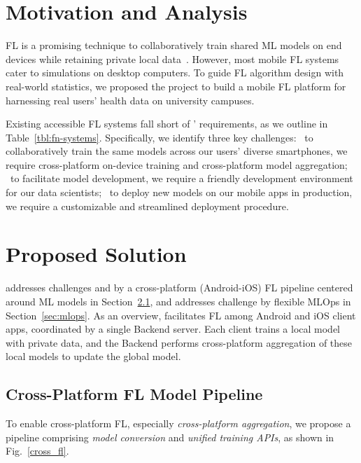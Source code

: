 \documentclass[conference]{IEEEtran}
\begin{document}
\section{Motivation and Analysis}

FL is a promising technique to collaboratively train shared ML models on
end devices while retaining private local data~\cite{wang2023federated}.
However, most mobile FL systems cater to simulations on desktop computers.
To guide FL algorithm design with real-world statistics,
we proposed the \FedCampus{} project to build a mobile FL platform for
harnessing real users' health data on university campuses.

Existing accessible FL systems fall short of \FedCampus{}' requirements,
as we outline in Table~\ref{tbl:fn-systems}.
Specifically, we identify three key challenges:
\challa~to collaboratively train the same models across
our users' diverse smartphones,
we require cross-platform on-device training and
cross-platform model aggregation;
\challb~to facilitate model development,
we require a friendly development environment for our data scientists;
\challc~to deploy new models on our mobile apps in production,
we require a customizable and streamlined deployment procedure.

\section{Proposed Solution}

\FedKit{} addresses challenges \challa{} and \challb{} by
a cross-platform (Android-iOS) FL pipeline centered around ML models in
Section~\ref{sec:pipeline},
and addresses challenge \challc{} by flexible MLOps in Section~\ref{sec:mlops}.
As an overview,
\FedKit{} facilitates FL among Android and iOS client apps,
coordinated by a single Backend server.
Each client trains a local model with private data,
and the Backend performs cross-platform aggregation of these local models to update the global model.

\subsection{Cross-Platform FL Model Pipeline}
\label{sec:pipeline}

To enable cross-platform FL,
especially \textit{cross-platform aggregation},
we propose a pipeline comprising
\textit{model conversion} and
\textit{unified training APIs},
as shown in Fig.~\ref{cross_fl}.
\end{document}
